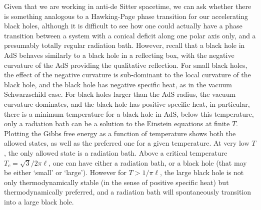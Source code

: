 \documentclass[
twoside,
openright,
frontopenright
]{dmathesis}
\begin{document}
Given that we are working in anti-de Sitter spacetime, we can ask whether there
is something analogous to a Hawking-Page phase transition \cite{Hawking:1982dh}
for our accelerating black holes, although it is difficult to see how one could
actually have a phase transition between a system with a conical deficit along
one polar axis only, and a presumably totally regular radiation bath.  However,
recall that a black hole in AdS behaves similarly to a black hole in a
reflecting box, with the negative curvature of the AdS providing the qualitative
reflection. For small black holes, the effect of the negative curvature is
sub-dominant to the local curvature of the black hole, and the black hole has
negative specific heat, as in the vacuum Schwarzschild case. For black holes
larger than the AdS radius, the vacuum curvature dominates, and the black hole
has positive specific heat, in particular, there is a minimum temperature for a
black hole in AdS, below this temperature, only a radiation bath can be a
solution to the Einstein equations at finite $T$. Plotting the Gibbs free energy
as a function of temperature shows both the allowed states, as well as the
preferred one for a given temperature.  At very low $T$, the only allowed state
is a radiation bath. Above a critical temperature $T_c = \sqrt{3}/2\pi\ell$, one
can have either a radiation bath, or a black hole (that may be either `small' or
`large'). However for $T>1/\pi\ell$, the large black hole is not only
thermodynamically stable (in the sense of positive specific heat) but
thermodynamically preferred, and a radiation bath will spontaneously transition
into a large black hole.
\end{document}
